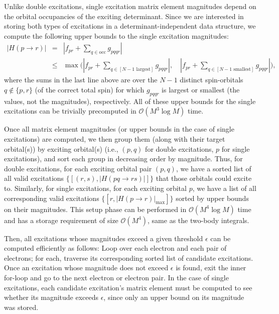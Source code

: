 \documentclass[english]{article}
\begin{document}
Unlike double excitations, single excitation matrix element magnitudes depend on the orbital occupancies of the exciting determinant. Since we are interested in storing both types of excitations in a determinant-independent data structure, we compute the following upper bounds to the single excitation magnitudes:
\begin{eqnarray}
	\left|H(p\rightarrow r)\right| &=& \left|f_{pr} + \sum_{q\in \textrm{occ}} g_{pqqr}\right|\\
	&\le&\max\Bigg( \left|f_{pr} + \sum_{q\in [N-1 \textrm{ largest}]} g_{pqqr}\right|,
	 \quad \left|f_{pr} + \sum_{q\in [N-1 \textrm{ smallest}]} g_{pqqr}\right|\Bigg),
\end{eqnarray}
where the sums in the last line above are over the $N-1$ distinct spin-orbitals $q\notin\{p,r\}$ (of the correct total spin) for which $g_{pqqr}$ is largest or smallest (the values, not the magnitudes), respectively. All of these upper bounds for the single excitations can be trivially precomputed in $\mathcal{O}(M^3\log M)$ time.

Once all matrix element magnitudes (or upper bounds in the case of single excitations) are computed, we then group them (along with their target orbital(s)) by exciting orbital(s) (i.e., $(p,q)$ for double excitations, $p$ for single excitations), and sort each group in decreasing order by magnitude. Thus, for double excitations, for each exciting orbital pair $(p,q)$, we have a sorted list of all valid excitations $\{[(r,s), |H(pq\rightarrow rs)|]\}$ that those orbitals could excite to. Similarly, for single excitations, for each exciting orbital $p$, we have a list of all corresponding valid excitations $\{[r, |H(p\rightarrow r)|_\textrm{max}]\}$ sorted by upper bounds on their magnitudes. This setup phase can be performed in $\mathcal{O}(M^4\log M)$ time and has a storage requirement of size $\mathcal{O}(M^4)$, same as the two-body integrals.

Then, all excitations whose magnitudes exceed a given threshold $\epsilon$ can be computed efficiently as follows: Loop over each electron and each pair of electrons; for each, traverse its corresponding sorted list of candidate excitations. Once an excitation whose magnitude does not exceed $\epsilon$ is found, exit the inner for-loop and go to the next electron or electron pair. In the case of single excitations, each candidate excitation's matrix element must be computed to see whether its magnitude exceeds $\epsilon$, since only an upper bound on its magnitude was stored.
\end{document}
